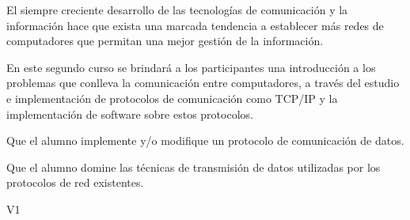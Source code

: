 \begin{syllabus}


\begin{justification}
El siempre creciente desarrollo de las tecnologías de comunicación y la
información hace que exista una marcada tendencia a  establecer
más redes de computadores que permitan una mejor
gestión de la información.

En este segundo curso se brindará a los participantes una introducción a los
problemas que conlleva la comunicación entre computadores, a través del
estudio e implementación de protocolos de comunicación como TCP/IP y
la implementación de software sobre estos protocolos.
\end{justification}

\begin{goals}
\item Que el alumno implemente y/o modifique un protocolo de comunicación de datos.
\item Que el alumno domine las técnicas de transmisión de datos utilizadas por los protocolos de red existentes.
\end{goals}


\begin{outcomes}{V1}
    \item {}
    \item {}
    \item {}
    \item {}
    \item {}
    \item {}
\end{outcomes}


\begin{competences}
    \item {}
    \item {}
    \item {}
    \item {}
    \item {}
    \item {}
    \item {}
\end{competences}


\end{syllabus}
